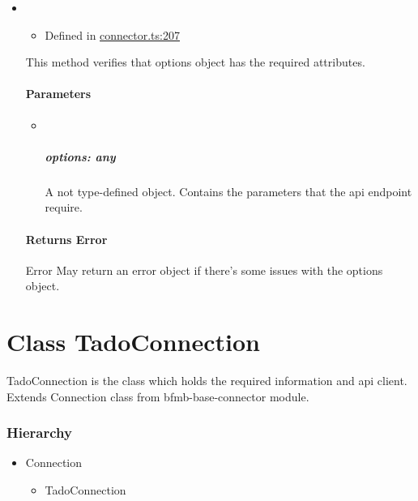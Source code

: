 \documentclass[]{article}
\providecommand{\tightlist}{%
  \setlength{\itemsep}{0pt}\setlength{\parskip}{0pt}}
\let\oldparagraph\paragraph
\renewcommand{\paragraph}[1]{\oldparagraph{#1}\mbox{}}
\let\oldsubparagraph\subparagraph
\renewcommand{\subparagraph}[1]{\oldsubparagraph{#1}\mbox{}}
\begin{document}
\begin{itemize}
\item
  \begin{itemize}
  \tightlist
  \item
    Defined in
    \href{https://github.com/BFMBFramework/TadoConnector/blob/f05932b/src/connector.ts\#L207}{connector.ts:207}
  \end{itemize}

  This method verifies that options object has the required attributes.

  \hypertarget{parameters-10}{%
  \paragraph{Parameters}\label{parameters-10}}

  \begin{itemize}
  \item ~
    \hypertarget{options-any-4}{%
    \subparagraph{\texorpdfstring{options:
    {any}}{options: any}}\label{options-any-4}}

    A not type-defined object. Contains the parameters that the api
    endpoint require.
  \end{itemize}

  \hypertarget{returns-error-1}{%
  \paragraph{\texorpdfstring{Returns
  {Error}}{Returns Error}}\label{returns-error-1}}

  Error May return an error object if there's some issues with the
  options object.
\end{itemize}

\hypertarget{class-tadoconnection}{%
\section{Class TadoConnection}\label{class-tadoconnection}}

TadoConnection is the class which holds the required information and api
client. Extends Connection class from bfmb-base-connector module.

\hypertarget{hierarchy}{%
\subsubsection{Hierarchy}\label{hierarchy}}

\begin{itemize}
\tightlist
\item
  {Connection}

  \begin{itemize}
  \tightlist
  \item
    {TadoConnection}
  \end{itemize}
\end{itemize}
\end{document}
